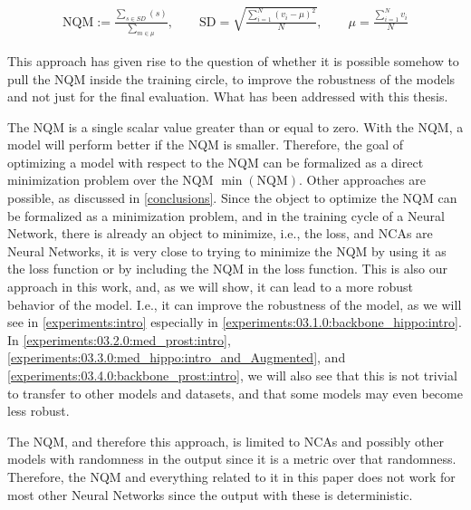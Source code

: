 \begin{align}
    \mathrm{NQM} := \frac{\sum_{s\in SD} (s)}  {\sum_{m\in\mu}}, \qquad
    \mathrm{SD} = \sqrt{\frac{\sum^N_{i=1}(v_i-\mu)^2}  {N}}, \qquad
    \mu = \frac{\sum^N_{i=1}v_i}  {N}
\end{align}


This approach has given rise to the question of whether it is possible somehow to pull the NQM inside the training circle, to improve the robustness of the models and not just for the final evaluation. What has been addressed with this thesis. 


The NQM is a single scalar value greater than or equal to zero. With the NQM, a model will perform better if the NQM is smaller. Therefore, the goal of optimizing a model with respect to the NQM can be formalized as a direct minimization problem over the NQM $\min(\text{NQM})$. Other approaches are possible, as discussed in \autoref{conclusions}. Since the object to optimize the NQM can be formalized as a minimization problem, and in the training cycle of a Neural Network, there is already an object to minimize, i.e., the loss, and NCAs are Neural Networks, it is very close to trying to minimize the NQM by using it as the loss function or by including the NQM in the loss function. This is also our approach in this work, and, as we will show, it can lead to a more robust behavior of the model. I.e., it can improve the robustness of the model, as we will see in \autoref{experiments:intro} especially in \autoref{experiments:03.1.0:backbone_hippo:intro}. In \autoref{experiments:03.2.0:med_prost:intro}, \ref{experiments:03.3.0:med_hippo:intro_and_Augmented}, and \ref{experiments:03.4.0:backbone_prost:intro}, we will also see that this is not trivial to transfer to other models and datasets, and that some models may even become less robust.


The NQM, and therefore this approach, is limited to NCAs and possibly other models with randomness in the output since it is a metric over that randomness. Therefore, the NQM and everything related to it in this paper does not work for most other Neural Networks since the output with these is deterministic.